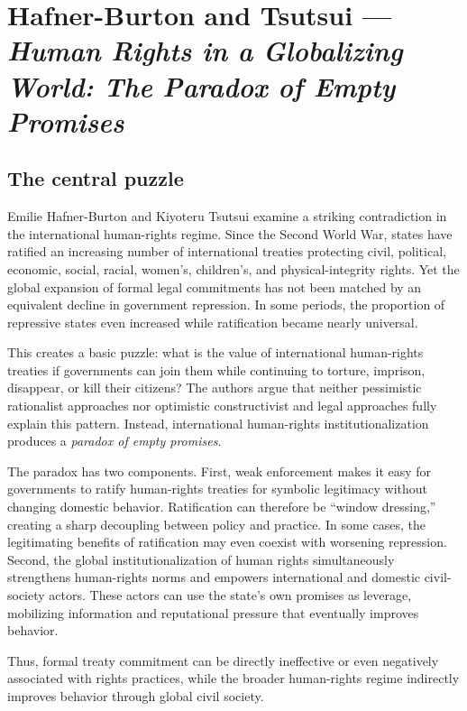 \clearpage
\section{Hafner-Burton and Tsutsui --- \textit{Human Rights in a Globalizing World: The Paradox of Empty Promises}}

\subsection{The central puzzle}

Emilie Hafner-Burton and Kiyoteru Tsutsui examine a striking contradiction in the international human-rights regime. Since the Second World War, states have ratified an increasing number of international treaties protecting civil, political, economic, social, racial, women's, children's, and physical-integrity rights. Yet the global expansion of formal legal commitments has not been matched by an equivalent decline in government repression. In some periods, the proportion of repressive states even increased while ratification became nearly universal.

This creates a basic puzzle: what is the value of international human-rights treaties if governments can join them while continuing to torture, imprison, disappear, or kill their citizens? The authors argue that neither pessimistic rationalist approaches nor optimistic constructivist and legal approaches fully explain this pattern. Instead, international human-rights institutionalization produces a \textit{paradox of empty promises}.

The paradox has two components. First, weak enforcement makes it easy for governments to ratify human-rights treaties for symbolic legitimacy without changing domestic behavior. Ratification can therefore be ``window dressing,'' creating a sharp decoupling between policy and practice. In some cases, the legitimating benefits of ratification may even coexist with worsening repression. Second, the global institutionalization of human rights simultaneously strengthens human-rights norms and empowers international and domestic civil-society actors. These actors can use the state's own promises as leverage, mobilizing information and reputational pressure that eventually improves behavior.

Thus, formal treaty commitment can be directly ineffective or even negatively associated with rights practices, while the broader human-rights regime indirectly improves behavior through global civil society.

